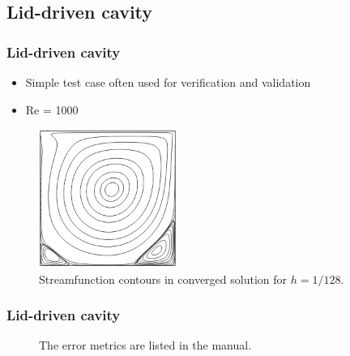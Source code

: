 \subsection{Lid-driven cavity}

\begin{frame}
    \frametitle{Lid-driven cavity}
\begin{itemize}
\item Simple test case often used for verification and validation
\item Re = 1000
\end{itemize}
\begin{figure}
\centering
\includegraphics[width=0.4\textwidth]{./driven_cavity/driven_cavity_streamfunction.png}
\caption{Streamfunction contours in converged solution for $h=1/128$.}
\end{figure}
\end{frame}

\begin{frame}
    \frametitle{Lid-driven cavity}
\begin{figure}
\centering
{}
\hspace{10mm}
\caption{The error metrics are listed in the manual.}
\end{figure}
\end{frame}




